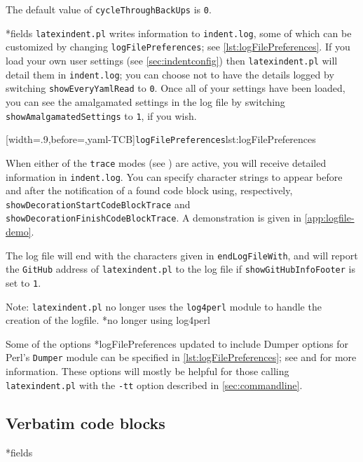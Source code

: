  The default value of \texttt{cycleThroughBackUps} is \texttt{0}.

*{fields}
 \texttt{latexindent.pl} writes information to \texttt{indent.log}, some
 of which can be customized by changing \texttt{logFilePreferences}; see
 \cref{lst:logFilePreferences}. If you load your own user settings (see
 \vref{sec:indentconfig}) then \texttt{latexindent.pl} will detail them in
 \texttt{indent.log}; you can choose not to have the details logged by switching
 \texttt{showEveryYamlRead} to \texttt{0}. Once all of your settings have been loaded, you
 can see the amalgamated settings in the log file by switching
 \texttt{showAmalgamatedSettings} to \texttt{1}, if you wish.

 [width=.9\linewidth,before=\centering,yaml-TCB]{\texttt{logFilePreferences}}{lst:logFilePreferences}

 When  either
 of the \texttt{trace} modes (see ) are active, you will
 receive detailed information in \texttt{indent.log}. You can specify character strings to
 appear before and after the notification of a found code block using, respectively,
 \texttt{showDecorationStartCodeBlockTrace} and
 \texttt{showDecorationFinishCodeBlockTrace}. A demonstration is given in
 \vref{app:logfile-demo}.%

 The log file will end with the characters given in \texttt{endLogFileWith}, and will
 report the \texttt{GitHub} address of \texttt{latexindent.pl} to the log file if
 \texttt{showGitHubInfoFooter} is set to \texttt{1}.

 Note: \texttt{latexindent.pl} no longer uses the \texttt{log4perl} module to handle the
 creation of the logfile. *{no longer using log4perl}%

 Some of the options *{logFilePreferences updated to include Dumper
 options} for Perl's \texttt{Dumper} module can be specified in
 \cref{lst:logFilePreferences}; see \cite{dumper} and \cite{dumperdemo} for more
 information. These options will mostly be helpful for those calling
 \texttt{latexindent.pl} with the \texttt{-tt} option described in \cref{sec:commandline}.%

\subsection{Verbatim code blocks}
*{fields}


